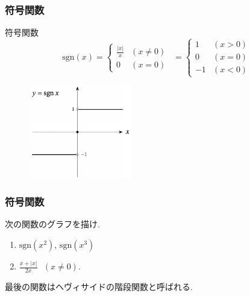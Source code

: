 \begin{frame}
\frametitle{符号関数}   

符号関数
$$
\mathrm{sgn}(x) = 
\begin{cases}
\frac{|x|}{x} & (x \ne 0) \\
0 & (x =0)
 \end{cases} \ \ 
 =
\begin{cases}
1 & (x > 0) \\
0 & (x =0) \\
-1 & (x<0)
 \end{cases}
$$

\vspace{-1mm}

\begin{figure}[htbp]
 \begin{center} 
  \includegraphics[width=45mm]{calculus2/sgn.png}
 \end{center}
\end{figure}
\vspace{-4mm}

\end{frame}







\begin{frame}
\frametitle{符号関数}   

\begin{Prob}
次の関数のグラフを描け. 
\begin{enumerate}
\item $\mathrm{sgn}(x^2)$, $\mathrm{sgn}(x^3)$
\item $\frac{x+|x|}{2x} \ \ \ (x \neq 0)$. 
\end{enumerate}
\end{Prob}
最後の関数はヘヴィサイドの階段関数と呼ばれる. 


\end{frame}




